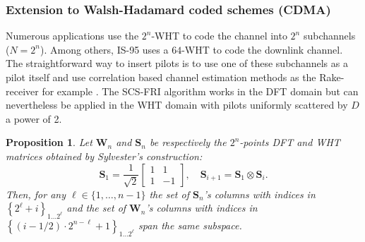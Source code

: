 \documentclass[journal,10pt]{IEEEtran}
\providecommand{\mat}[1]{\boldsymbol{#1}}
\providecommand{\krop}{\otimes}
\newtheorem{proposition}{Proposition}
\begin{document}
\subsubsection{Extension to Walsh-Hadamard coded schemes (CDMA)}
Numerous applications use the $2^n$-WHT to code the channel into $2^n$ subchannels ($N=2^n$). Among others, IS-95 uses a $64$-WHT to code the downlink channel. The straightforward way to insert pilots is to use one of these subchannels as a pilot itself and use correlation based channel estimation methods as the Rake-receiver for example  \cite{Price1958}. The SCS-FRI algorithm works in the DFT domain but can nevertheless be applied in the WHT domain with pilots uniformly scattered by $D$ a power of 2.
\begin{proposition}\label{prop:WHT}
Let $\mat W_n$ and $\mat S_n$ be respectively the $2^n$-points DFT and WHT matrices obtained by Sylvester's construction:
$$\mat S_1=\frac{1}{\sqrt{2}}\begin{bmatrix}1 &1\\1 &-1\end{bmatrix},\quad \mat S_{i+1}=\mat S_1 \krop \mat S_i.$$
Then, for any $\ell\in\lbrace 1,\dots , n-1\rbrace$ the set of $\mat S_n$'s columns  with indices in $\left\lbrace 2^\ell+i\right\rbrace_{1\dots 2^\ell}$  and the set of $\mat W_n$'s columns with indices in $\left\lbrace (i-1/2)\cdot 2^{n-\ell}+1\right\rbrace_{1\dots 2^\ell}$ span the same subspace.
\end{proposition}
\end{document}
